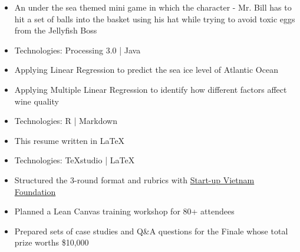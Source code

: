 \documentclass[10pt,a4paper,ragged2e]{altacv}
\begin{document}



\begin{fullwidth}
\makecvheader
\end{fullwidth}



\begin{itemize}
\item An under the sea themed mini game in which the character - Mr. Bill has to hit a set of balls into the basket using his hat while trying to avoid toxic eggs from the Jellyfish Boss
\item Technologies: Processing 3.0 | Java
\end{itemize}

\divider

\begin{itemize}
\item Applying Linear Regression to predict the sea ice level of Atlantic Ocean
\item Applying Multiple Linear Regression to identify how different factors affect wine quality
\item Technologies: R | Markdown
\end{itemize}

\divider

\begin{itemize}
	\item This resume written in LaTeX
	\item Technologies: TeXstudio | LaTeX
\end{itemize}



\begin{itemize}
	\item Structured the 3-round format and rubrics with {\href{https://svf.org.vn/}{Start-up Vietnam Foundation}} 
	\item Planned a Lean Canvas training workshop for 80+ attendees
	\item Prepared sets of case studies and Q\&A questions for the Finale whose total prize worths \$10,000
\end{itemize}
\end{document}
